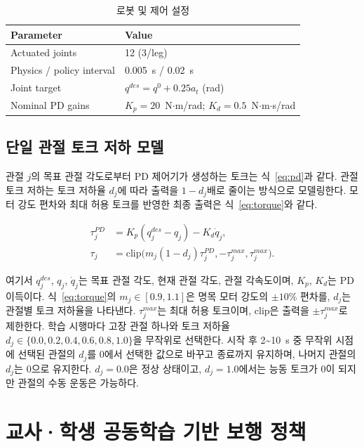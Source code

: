 \begin{table}[!t]
\caption{로봇 및 제어 설정}\label{tab:system}
\centering\paperTableFont
\begin{tabularx}{\columnwidth}{@{}lY@{}}
\toprule
Parameter & Value \\
\midrule
Actuated joints & 12 (3/leg) \\
Physics / policy interval & 0.005~s / 0.02~s \\
Joint target & $q^{des}=q^0+0.25a_t$ (rad) \\
Nominal PD gains & $K_p=20$~N$\cdot$m/rad; $K_d=0.5$~N$\cdot$m$\cdot$s/rad \\
\bottomrule
\end{tabularx}
\end{table}


\subsection{단일 관절 토크 저하 모델}
관절 $j$의 목표 관절 각도로부터 PD 제어기가 생성하는 토크는 식~\eqref{eq:pd}과 같다. 관절 토크 저하는 토크 저하율 $d_j$에 따라 출력을 $1-d_j$배로 줄이는 방식으로 모델링한다\cite{adapt}. 모터 강도 편차와 최대 허용 토크를 반영한 최종 출력은 식~\eqref{eq:torque}와 같다.
\begin{paperdisplay}[-0.83bp]
\begin{align}
\tau_j^{PD}&=K_p(q_j^{des}-q_j)-K_d\dot q_j,\label{eq:pd} \\
\tau_j&=\mathrm{clip}\bigl(m_j(1-d_j)\tau_j^{PD},-\tau_j^{max},\tau_j^{max}\bigr).\label{eq:torque}
\end{align}
\end{paperdisplay}
여기서 $q_j^{des}$, $q_j$, $\dot q_j$는 목표 관절 각도, 현재 관절 각도, 관절 각속도이며, $K_p$, $K_d$는 PD 이득이다. 식~\eqref{eq:torque}의 $m_j\in[0.9,1.1]$은 명목 모터 강도의 $\pm10$\% 편차를, $d_j$는 관절별 토크 저하율을 나타낸다. $\tau_j^{max}$는 최대 허용 토크이며, $\mathrm{clip}$은 출력을 $\pm\tau_j^{max}$로 제한한다.
학습 시행마다 고장 관절 하나와 토크 저하율 $d_j\in\{0.0,0.2,0.4,0.6,0.8,1.0\}$을 무작위로 선택한다. 시작 후 2\textasciitilde{}10~s 중 무작위 시점에 선택된 관절의 $d_j$를 0에서 선택한 값으로 바꾸고 종료까지 유지하며, 나머지 관절의 $d_j$는 0으로 유지한다. $d_j=0.0$은 정상 상태이고, $d_j=1.0$에서는 능동 토크가 0이 되지만 관절의 수동 운동은 가능하다.

\section{교사·학생 공동학습 기반 보행 정책}

